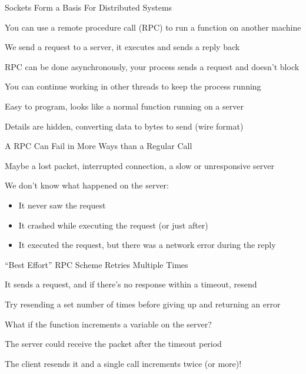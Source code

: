   \begin{frame}{Sockets Form a Basis For Distributed Systems}

    You can use a remote procedure call (RPC) to run a function on another
    machine

    \hspace{2em} We send a request to a server, it executes and sends a reply
                 back

    \vspace{2em}

    RPC can be done asynchronously, your process sends a request and doesn't
    block

    \hspace{2em} You can continue working in other threads to keep the process
                 running

    \vspace{2em}

    Easy to program, looks like a normal function running on a server

    \hspace{2em} Details are hidden, converting data to bytes to send (wire
                 format)
  \end{frame}

  \begin{frame}{A RPC Can Fail in More Ways than a Regular Call}

    Maybe a lost packet, interrupted connection, a slow or unresponsive server

    \vspace{2em}

    We don't know what happened on the server:

    \begin{itemize}
      \item It never saw the request
      \item It crashed while executing the request (or just after)
      \item It executed the request, but there was a network error during the
            reply
    \end{itemize}
  \end{frame}

  \begin{frame}{``Best Effort'' RPC Scheme Retries Multiple Times}

    It sends a request, and if there's no response within a timeout, resend 

    \hspace{2em} Try resending a set number of times before giving up and
                 returning an error

    \vspace{2em}

    What if the function increments a variable on the server?

    \hspace{2em} The server could receive the packet after the timeout period

    \hspace{4em} The client resends it and a single call increments twice (or more)!
  \end{frame}

